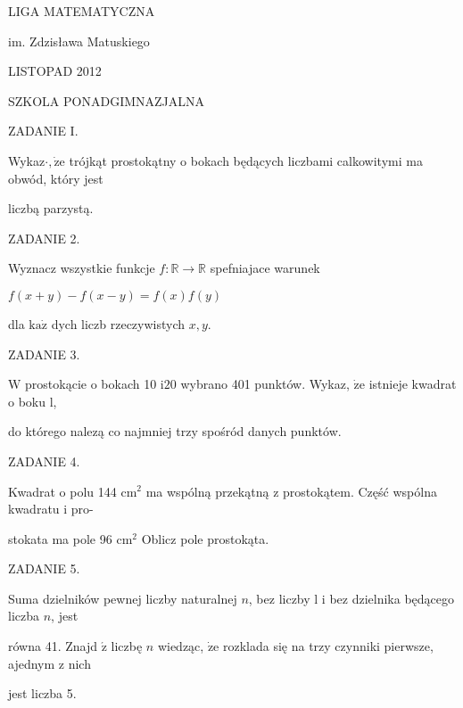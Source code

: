 \documentclass[a4paper,12pt]{article}
\begin{document}
LIGA MATEMATYCZNA

im. Zdzisława Matuskiego

LISTOPAD 2012

SZKOLA PONADGIMNAZJALNA

ZADANIE I.

Wykaz$\cdot, \dot{\mathrm{z}}\mathrm{e}$ trójkąt prostokątny o bokach będących liczbami calkowitymi ma obwód, który jest

liczbą parzystą.

ZADANIE 2.

Wyznacz wszystkie funkcje $f:\mathbb{R}\rightarrow \mathbb{R}$ spefniajace warunek

$f(x+y)-f(x-y)=f(x)f(y)$

dla $\mathrm{k}\mathrm{a}\dot{\mathrm{z}}$ dych liczb rzeczywistych $x, y.$

ZADANIE 3.

$\mathrm{W}$ prostokącie o bokach 10 $\mathrm{i}20$ wybrano 401 punktów. Wykaz, $\dot{\mathrm{z}}\mathrm{e}$ istnieje kwadrat o boku l,

do którego nalezą co najmniej trzy spośród danych punktów.

ZADANIE 4.

Kwadrat o polu 144 $\mathrm{c}\mathrm{m}^{2}$ ma wspólną przekątną z prostokątem. Część wspólna kwadratu i pro-

stokata ma pole 96 $\mathrm{c}\mathrm{m}^{2}$ Oblicz pole prostokąta.

ZADANIE 5.

Suma dzielników pewnej liczby naturalnej $n$, bez liczby l i bez dzielnika będącego liczba $n$, jest

równa 41. Znajd $\acute{\mathrm{z}}$ liczbę $n$ wiedząc, $\dot{\mathrm{z}}\mathrm{e}$ rozklada się na trzy czynniki pierwsze, ajednym z nich

jest liczba 5.
\end{document}
